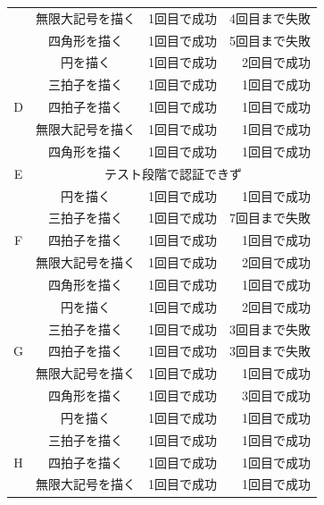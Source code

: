 \documentclass[11pt]{jreport}
\begin{document}
\begin{center}
\begin{longtable}{|c|c|r|r|}
                  & 無限大記号を描く & 1回目で成功 & 4回目まで失敗 \\ \cline{2-4}
                  & 四角形を描く & 1回目で成功 & 5回目まで失敗 \\ \hline %
                  & 円を描く & 1回目で成功 & 2回目で成功 \\ \cline{2-4} %
                  & 三拍子を描く & 1回目で成功 & 1回目で成功 \\ \cline{2-4}
                D & 四拍子を描く & 1回目で成功 & 1回目で成功 \\ \cline{2-4}
                  & 無限大記号を描く & 1回目で成功 & 1回目で成功 \\ \cline{2-4}
                  & 四角形を描く & 1回目で成功 & 1回目で成功 \\ \hline %
                E & \multicolumn{3}{|c|}{テスト段階で認証できず} \\ \hline
                  & 円を描く & 1回目で成功 & 1回目で成功 \\ \cline{2-4} %
                  & 三拍子を描く & 1回目で成功 & 7回目まで失敗 \\ \cline{2-4}
                F & 四拍子を描く & 1回目で成功 & 1回目で成功 \\ \cline{2-4}
                  & 無限大記号を描く & 1回目で成功 & 2回目で成功 \\ \cline{2-4}
                  & 四角形を描く & 1回目で成功 & 1回目で成功 \\ \hline %
                  & 円を描く & 1回目で成功 & 2回目で成功 \\ \cline{2-4} %
                  & 三拍子を描く & 1回目で成功 & 3回目まで失敗 \\ \cline{2-4}
                G & 四拍子を描く & 1回目で成功 & 3回目まで失敗 \\ \cline{2-4}
                  & 無限大記号を描く & 1回目で成功 & 1回目で成功 \\ \cline{2-4}
                  & 四角形を描く & 1回目で成功 & 3回目で成功 \\ \hline %
                  & 円を描く & 1回目で成功 & 1回目で成功 \\ \cline{2-4} %
                  & 三拍子を描く & 1回目で成功 & 1回目で成功 \\ \cline{2-4}
                H & 四拍子を描く & 1回目で成功 & 1回目で成功 \\ \cline{2-4}
                  & 無限大記号を描く & 1回目で成功 & 1回目で成功 \\ \cline{2-4}

\end{longtable}
\end{center}
\end{document}
